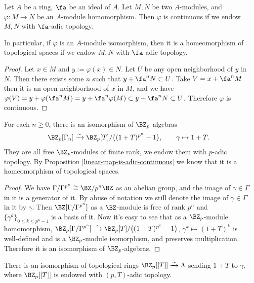 \begin{prop}
\label{linear-map-is-adic-continuous}
Let $A$ be a ring, $\fa$ be an ideal of $A$.
Let $M,N$ be two $A$-modules,
and $\varphi:M\to N$ be an $A$-module homomorphism.
Then $\varphi$ is continuous if we endow $M,N$ with $\fa$-adic topology.

In particular, if $\varphi$ is an $A$-module isomorphism,
then it is a homeomorphism of topological spaces if we endow $M,N$ with $\fa$-adic topology.
\end{prop}

\begin{proof}
Let $x\in M$ and $y:=\varphi(x)\in N$.
Let $U$ be any open neighborhood of $y$ in $N$.
Then there exists some $n$ such that $y+\fa^nN\subset U$.
Take $V=x+\fa^nM$ then it is an open neighborhood of $x$ in $M$,
and we have $\varphi(V)=y+\varphi(\fa^nM)=y+\fa^n\varphi(M)\subset y+\fa^nN\subset U$.
Therefore $\varphi$ is continuous.
\end{proof}

\begin{prop}
\label{Iwasawa-alg-isom-finite-level}
For each $n\geq 0$, there is an isomorphism of $\BZ_p$-algebras
$$
\BZ_p[\Gamma_n]\xrightarrow\sim\BZ_p[T]/\big((1+T)^{p^n}-1\big),\qquad
\gamma\mapsto 1+T.
$$
They are all free $\BZ_p$-modules of finite rank,
we endow them with $p$-adic topology.
By Proposition \ref{linear-map-is-adic-continuous}
we know that it is a homeomorphism of topological spaces.
\end{prop}

\begin{proof}
We have $\Gamma/\Gamma^{p^n}\cong\BZ/p^n\BZ$ as an abelian group,
and the image of $\gamma\in\Gamma$
in it is a generator of it. By abuse of notation we still denote the image of
$\gamma\in\Gamma$ in it by $\gamma$.
Then $\BZ[\Gamma/\Gamma^{p^n}]$ as a $\BZ$-module is free of rank $p^n$
and $\{\gamma^k\}_{0\leq k\leq p^n-1}$ is a basis of it.
Now it's easy to see that as a $\BZ_p$-module homomorphism,
$\BZ_p[\Gamma/\Gamma^{p^n}]\xrightarrow\sim\BZ_p[T]/\big((1+T)^{p^n}-1\big)$,
$\gamma^k\mapsto(1+T)^k$ is well-defined and is a $\BZ_p$-module isomorphism,
and preserves multiplication.
Therefore it is an isomorphism of $\BZ_p$-algebras.
\end{proof}

\begin{prop}
\label{Iwasawa-alg-isom}
There is an isomorphism of topological rings
$\BZ_p[[T]]\xrightarrow\sim\Lambda$
sending $1+T$ to $\gamma$,
where $\BZ_p[[T]]$ is endowed with $(p,T)$-adic topology.
\end{prop}

